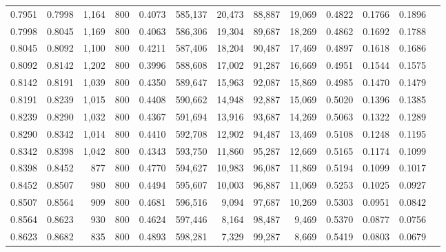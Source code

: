 \begin{tabular}{rrrrrrrrrrrrr}
0.7951 & 0.7998 &  1,164 &   800 &                                     0.4073 & 585,137 &  20,473 &  88,887 &  19,069 & 0.4822 & 0.1766 & 0.1896 \\
0.7998 & 0.8045 &  1,169 &   800 &                                     0.4063 & 586,306 &  19,304 &  89,687 &  18,269 & 0.4862 & 0.1692 & 0.1788 \\
0.8045 & 0.8092 &  1,100 &   800 &                                     0.4211 & 587,406 &  18,204 &  90,487 &  17,469 & 0.4897 & 0.1618 & 0.1686 \\
0.8092 & 0.8142 &  1,202 &   800 &                                     0.3996 & 588,608 &  17,002 &  91,287 &  16,669 & 0.4951 & 0.1544 & 0.1575 \\
0.8142 & 0.8191 &  1,039 &   800 &                                     0.4350 & 589,647 &  15,963 &  92,087 &  15,869 & 0.4985 & 0.1470 & 0.1479 \\
0.8191 & 0.8239 &  1,015 &   800 &                                     0.4408 & 590,662 &  14,948 &  92,887 &  15,069 & 0.5020 & 0.1396 & 0.1385 \\
0.8239 & 0.8290 &  1,032 &   800 &                                     0.4367 & 591,694 &  13,916 &  93,687 &  14,269 & 0.5063 & 0.1322 & 0.1289 \\
0.8290 & 0.8342 &  1,014 &   800 &                                     0.4410 & 592,708 &  12,902 &  94,487 &  13,469 & 0.5108 & 0.1248 & 0.1195 \\
0.8342 & 0.8398 &  1,042 &   800 &                                     0.4343 & 593,750 &  11,860 &  95,287 &  12,669 & 0.5165 & 0.1174 & 0.1099 \\
0.8398 & 0.8452 &    877 &   800 &                                     0.4770 & 594,627 &  10,983 &  96,087 &  11,869 & 0.5194 & 0.1099 & 0.1017 \\
0.8452 & 0.8507 &    980 &   800 &                                     0.4494 & 595,607 &  10,003 &  96,887 &  11,069 & 0.5253 & 0.1025 & 0.0927 \\
0.8507 & 0.8564 &    909 &   800 &                                     0.4681 & 596,516 &   9,094 &  97,687 &  10,269 & 0.5303 & 0.0951 & 0.0842 \\
0.8564 & 0.8623 &    930 &   800 &                                     0.4624 & 597,446 &   8,164 &  98,487 &   9,469 & 0.5370 & 0.0877 & 0.0756 \\
0.8623 & 0.8682 &    835 &   800 &                                     0.4893 & 598,281 &   7,329 &  99,287 &   8,669 & 0.5419 & 0.0803 & 0.0679 \\

\end{tabular}
